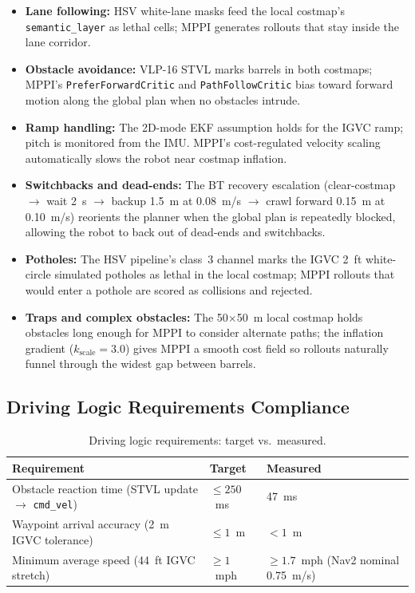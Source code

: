 \documentclass[12pt, letterpaper]{article}
\begin{document}
\begin{itemize}
    \item \textbf{Lane following:} HSV white-lane masks feed the local costmap's
    \texttt{semantic\_layer} as lethal cells; MPPI generates rollouts that stay inside
    the lane corridor.
    \item \textbf{Obstacle avoidance:} VLP-16 STVL marks barrels in both costmaps; MPPI's
    \texttt{PreferForwardCritic} and \texttt{PathFollowCritic} bias toward forward motion
    along the global plan when no obstacles intrude.
    \item \textbf{Ramp handling:} The 2D-mode EKF assumption holds for the IGVC ramp;
    pitch is monitored from the IMU. MPPI's cost-regulated velocity scaling
    automatically slows the robot near costmap inflation.
    \item \textbf{Switchbacks and dead-ends:} The BT recovery escalation
    (clear-costmap $\to$ wait 2~s $\to$ backup 1.5~m at 0.08~m/s $\to$ crawl forward
    0.15~m at 0.10~m/s) reorients the planner when the global plan is repeatedly
    blocked, allowing the robot to back out of dead-ends and switchbacks.
    \item \textbf{Potholes:} The HSV pipeline's class~3 channel marks the IGVC 2~ft
    white-circle simulated potholes as lethal in the local costmap; MPPI rollouts that
    would enter a pothole are scored as collisions and rejected.
    \item \textbf{Traps and complex obstacles:} The 50$\times$50~m local costmap holds
    obstacles long enough for MPPI to consider alternate paths; the inflation gradient
    ($k_{\text{scale}}=3.0$) gives MPPI a smooth cost field so rollouts naturally
    funnel through the widest gap between barrels.
\end{itemize}

\subsection{Driving Logic Requirements Compliance}

\begin{table}[H]
    \centering
    \small
    \caption{Driving logic requirements: target vs.\ measured.}
    \begin{tabularx}{\textwidth}{X l l}
        \toprule
        \textbf{Requirement} & \textbf{Target} & \textbf{Measured} \\
        \midrule
        Obstacle reaction time (STVL update $\to$ \texttt{cmd\_vel}) & $\leq 250$~ms & 47~ms \\
        Waypoint arrival accuracy (2~m IGVC tolerance)               & $\leq 1$~m    & $<1$~m \\
        Minimum average speed (44~ft IGVC stretch)                    & $\geq 1$~mph  & $\geq 1.7$~mph (Nav2 nominal 0.75~m/s) \\
        \bottomrule
    \end{tabularx}
\end{table}
\end{document}
